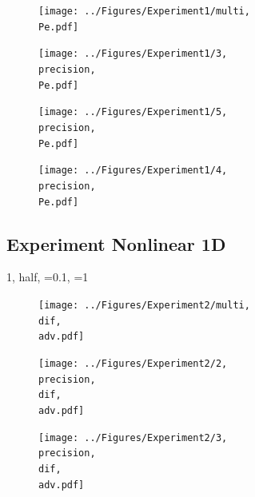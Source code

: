 \documentclass{scrartcl}
\begin{document}
	
	\begin{figure}[H]
		\centering
		\texttt{[image: ../Figures/Experiment1/multi, \\Pe.pdf]}
	\end{figure}
	
	\begin{figure}[H]
		\centering
		\texttt{[image: ../Figures/Experiment1/3, \\precision, \\Pe.pdf]}
	\end{figure}
	
	\begin{figure}[H]
		\centering
		\texttt{[image: ../Figures/Experiment1/5, \\precision, \\Pe.pdf]}
	\end{figure}
	
	\begin{figure}[H]
		\centering
		\texttt{[image: ../Figures/Experiment1/4, \\precision, \\Pe.pdf]}
	\end{figure}
	
	
	\newpage
	\subsection{Experiment Nonlinear 1D}
	\newcommand{\dif}{\detokenize{α}=0.1}
	\newcommand{\adv}{=1}
	\renewcommand{\precision}{half}
	{1, \precision, \dif, \adv}
	\begin{figure}[H]
		\centering
		\texttt{[image: ../Figures/Experiment2/multi, \\dif, \\adv.pdf]}
	\end{figure}
	
	\begin{figure}[H]
		\centering
		\texttt{[image: ../Figures/Experiment2/2, \\precision, \\dif, \\adv.pdf]}
	\end{figure}
	
	\begin{figure}[H]
		\centering
		\texttt{[image: ../Figures/Experiment2/3, \\precision, \\dif, \\adv.pdf]}
	\end{figure}
	
\end{document}
